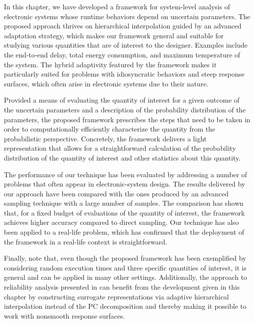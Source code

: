 In this chapter, we have developed a framework for system-level analysis of
electronic systems whose runtime behaviors depend on uncertain parameters. The
proposed approach thrives on hierarchical interpolation guided by an advanced
adaptation strategy, which makes our framework general and suitable for studying
various quantities that are of interest to the designer. Examples include the
end-to-end delay, total energy consumption, and maximum temperature of the
system. The hybrid adaptivity featured by the framework makes it particularly
suited for problems with idiosyncratic behaviors and steep response surfaces,
which often arise in electronic systems due to their nature.

Provided a means of evaluating the quantity of interest for a given outcome of
the uncertain parameters and a description of the probability distribution of
the parameters, the proposed framework prescribes the steps that need to be
taken in order to computationally efficiently characterize the quantity from the
probabilistic perspective. Concretely, the framework delivers a light
representation that allows for a straightforward calculation of the probability
distribution of the quantity of interest and other statistics about this
quantity.

The performance of our technique has been evaluated by addressing a number of
problems that often appear in electronic-system design. The results delivered by
our approach have been compared with the ones produced by an advanced sampling
technique with a large number of samples. The comparison has shown that, for a
fixed budget of evaluations of the quantity of interest, the framework achieves
higher accuracy compared to direct sampling. Our technique has also been applied
to a real-life problem, which has confirmed that the deployment of the framework
in a real-life context is straightforward.

Finally, note that, even though the proposed framework has been exemplified by
considering random execution times and three specific quantities of interest, it
is general and can be applied in many other settings. Additionally, the approach
to reliability analysis presented in  can
benefit from the development given in this chapter by constructing surrogate
representations via adaptive hierarchical interpolation instead of the \ac{PC}
decomposition and thereby making it possible to work with nonsmooth response
surfaces.
